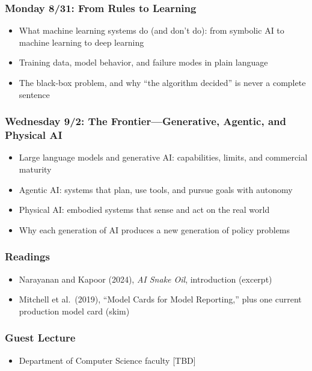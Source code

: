 \documentclass[12pt]{article}
\begin{document}
    \subsubsection*{Monday 8/31: From Rules to Learning}
        \begin{itemize}
            \item What machine learning systems do (and don't do): from symbolic AI to machine learning to deep learning
            \item Training data, model behavior, and failure modes in plain language
            \item The black-box problem, and why ``the algorithm decided'' is never a complete sentence
        \end{itemize}
    \subsubsection*{Wednesday 9/2: The Frontier---Generative, Agentic, and Physical AI}
        \begin{itemize}
            \item Large language models and generative AI: capabilities, limits, and commercial maturity
            \item Agentic AI: systems that plan, use tools, and pursue goals with autonomy
            \item Physical AI: embodied systems that sense and act on the real world
            \item Why each generation of AI produces a new generation of policy problems
        \end{itemize}
    \subsubsection*{Readings}
        \begin{itemize}
            \item Narayanan and Kapoor (2024), \emph{AI Snake Oil}, introduction (excerpt)
            \item Mitchell et al.\ (2019), ``Model Cards for Model Reporting,'' plus one current production model card (skim)
        \end{itemize}
    \subsubsection*{Guest Lecture}
        \begin{itemize}
            \item Department of Computer Science faculty [TBD]
        \end{itemize}
\end{document}
